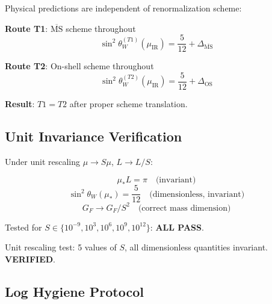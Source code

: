 \documentclass[11pt,a4paper]{article}
\begin{document}
\begin{invariancebox}
\label{box:scheme-inv}
Physical predictions are independent of renormalization scheme:

\textbf{Route T1}: $\overline{\text{MS}}$ scheme throughout
\begin{equation}
\label{eq:scheme-T1}
\sin^2\theta_W^{(T1)}(\mu_{\text{IR}}) = \frac{5}{12} + \Delta_{\overline{\text{MS}}}
\end{equation}

\textbf{Route T2}: On-shell scheme throughout
\begin{equation}
\label{eq:scheme-T2}
\sin^2\theta_W^{(T2)}(\mu_{\text{IR}}) = \frac{5}{12} + \Delta_{\text{OS}}
\end{equation}

\textbf{Result}: $T1 = T2$ after proper scheme translation.
\end{invariancebox}

\subsection{Unit Invariance Verification}
\label{subsec:unit-invariance}

\begin{invariancebox}
\label{box:unit-inv}
Under unit rescaling $\mu \to S\mu$, $L \to L/S$:

\begin{equation}
\label{eq:unit-scaling}
\mu_* L = \pi \quad \text{(invariant)}
\end{equation}
\begin{equation}
\label{eq:sin2-unit-inv}
\sin^2\theta_W(\mu_*) = \frac{5}{12} \quad \text{(dimensionless, invariant)}
\end{equation}
\begin{equation}
\label{eq:gf-unit-scaling}
G_F \to G_F / S^2 \quad \text{(correct mass dimension)}
\end{equation}

Tested for $S \in \{10^{-9}, 10^3, 10^6, 10^9, 10^{12}\}$: \textbf{ALL PASS}.
\end{invariancebox}

\begin{trapbox}
\label{trap:rt10}
Unit rescaling test: 5 values of $S$, all dimensionless quantities invariant. \textbf{VERIFIED}.
\end{trapbox}

\subsection{Log Hygiene Protocol}
\label{subsec:log-hygiene}
\end{document}
